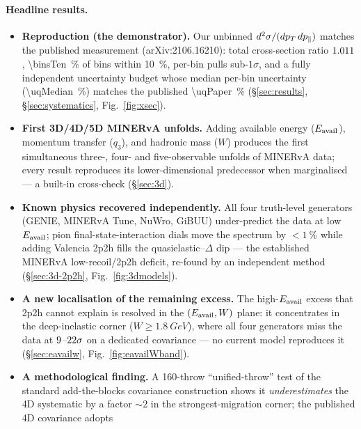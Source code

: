 \paragraph{Headline results.}
\begin{itemize}[itemsep=2pt]
  \item \textbf{Reproduction (the demonstrator).} Our unbinned
        $d^{2}\sigma/(dp_{T}\,dp_{\parallel})$ matches the published measurement
        (arXiv:2106.16210): total cross-section ratio $1.011$,
        \SI{\binsTen}{\percent} of bins within \SI{10}{\percent}, per-bin pulls
        sub-$1\sigma$, and a fully independent uncertainty budget whose
        median per-bin uncertainty (\SI{\uqMedian}{\percent}) matches the
        published \SI{\uqPaper}{\percent} (\S\ref{sec:results},
        \S\ref{sec:systematics}, Fig.~\ref{fig:xsec}).
  \item \textbf{First 3D/4D/5D MINERvA unfolds.} Adding available energy
        ($E_{\mathrm{avail}}$), momentum transfer ($q_{3}$), and hadronic mass ($W$)
        produces the first simultaneous three-, four- and five-observable
        unfolds of MINERvA data; every result reproduces its
        lower-dimensional predecessor when marginalised --- a built-in
        cross-check (\S\ref{sec:3d}).
  \item \textbf{Known physics recovered independently.} All four truth-level
        generators (GENIE, MINERvA Tune, NuWro, GiBUU) under-predict the
        data at low $E_{\mathrm{avail}}$; pion final-state-interaction dials move the
        spectrum by $<\SI{1}{\percent}$ while adding Valencia 2p2h fills the
        quasielastic--$\Delta$ dip --- the established MINERvA
        low-recoil/2p2h deficit, re-found by an independent method
        (\S\ref{sec:3d-2p2h}, Fig.~\ref{fig:3dmodels}).
  \item \textbf{A new localisation of the remaining excess.} The
        high-$E_{\mathrm{avail}}$ excess that 2p2h cannot explain is resolved in the
        $(E_{\mathrm{avail}},W)$ plane: it concentrates in the deep-inelastic corner
        ($W\ge\SI{1.8}{GeV}$), where all four generators miss the data at
        $9$--$22\sigma$ on a dedicated covariance --- no current model
        reproduces it (\S\ref{sec:eavailw}, Fig.~\ref{fig:eavailWband}).
  \item \textbf{A methodological finding.} A 160-throw ``unified-throw''
        test of the standard add-the-blocks covariance construction shows
        it \emph{underestimates} the 4D systematic by a factor $\sim2$ in
        the strongest-migration corner; the published 4D covariance adopts

\end{itemize}
